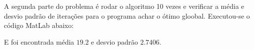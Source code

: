 \documentclass[12pt]{article}
\newenvironment{exercise}[2][Exercício]{\begin{trivlist}
\item[\hskip \labelsep {\bfseries #1}\hskip \labelsep {\bfseries #2.}]}{\end{trivlist}}
\begin{document}
\begin{exercise}{2}
A segunda parte do problema é rodar o algoritmo 10 vezes e verificar a média e
desvio padrão de iterações para o programa achar o ótimo gloobal.
Executou-se o código MatLab abaixo:


E foi encontrada média $19.2$ e desvio padrão $2.7406$.

\end{exercise}
\end{document}
